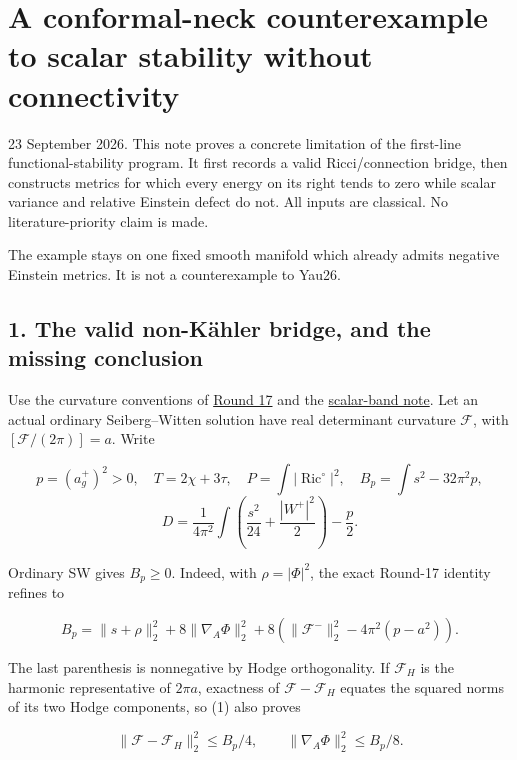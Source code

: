 \documentclass[
  11pt,
]{article}
\author{}
\date{23 September 2026}
\begin{document}
\hypertarget{a-conformal-neck-counterexample-to-scalar-stability-without-connectivity}{%
\section{A conformal-neck counterexample to scalar stability without
connectivity}\label{a-conformal-neck-counterexample-to-scalar-stability-without-connectivity}}

23 September 2026. This note proves a concrete limitation of the
first-line functional-stability program. It first records a valid
Ricci/connection bridge, then constructs metrics for which every energy
on its right tends to zero while scalar variance and relative Einstein
defect do not. All inputs are classical. No literature-priority claim is
made.

The example stays on one fixed smooth manifold which already admits
negative Einstein metrics. It is not a counterexample to Yau26.

\hypertarget{the-valid-non-kuxe4hler-bridge-and-the-missing-conclusion}{%
\subsection{1. The valid non-Kähler bridge, and the missing
conclusion}\label{the-valid-non-kuxe4hler-bridge-and-the-missing-conclusion}}

Use the curvature conventions of \href{round17_integral.md}{Round 17}
and the \href{line1_scalar_band_remainder.md}{scalar-band note}. Let an
actual ordinary Seiberg--Witten solution have real determinant curvature
\(\mathcal F\), with \([\mathcal F/(2\pi)]=a\). Write

\[
 p=(a_g^+)^2>0,\quad T=2\chi+3\tau,\quad
 P=\int|\operatorname{Ric}^{\circ}|^2,\quad
 B_p=\int s^2-32\pi^2p,
\] \[
 D=\frac1{4\pi^2}\int\left(\frac{s^2}{24}
                +\frac{|W^+|^2}{2}\right)-\frac p2.
\]

Ordinary SW gives \(B_p\ge0\). Indeed, with \(\rho=|\Phi|^2\), the exact
Round-17 identity refines to

\[
 \boxed{B_p=\|s+\rho\|_2^2+8\|\nabla_A\Phi\|_2^2
 +8\left(\|\mathcal F^-\|_2^2-4\pi^2(p-a^2)\right).}
 \tag{1}
\]

The last parenthesis is nonnegative by Hodge orthogonality. If
\(\mathcal F_H\) is the harmonic representative of \(2\pi a\), exactness
of \(\mathcal F-\mathcal F_H\) equates the squared norms of its two
Hodge components, so (1) also proves

\[
 \|\mathcal F-\mathcal F_H\|_2^2\le B_p/4,
 \qquad \|\nabla_A\Phi\|_2^2\le B_p/8.
 \tag{2}
\]
\end{document}
